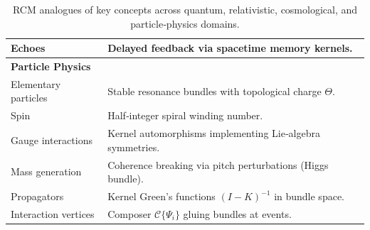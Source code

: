 \begin{table}[H]
\begin{tabular}{p{} p{}}
    Echoes 
      & Delayed feedback via spacetime memory kernels. \\[4pt]
    \midrule
    \multicolumn{2}{l}{\textbf{Particle Physics}} \\[-3pt]
    \midrule
    Elementary particles 
      & Stable resonance bundles with topological charge $\Theta$. \\
    Spin 
      & Half‐integer spiral winding number. \\
    Gauge interactions 
      & Kernel automorphisms implementing Lie‐algebra symmetries. \\
    Mass generation 
      & Coherence breaking via pitch perturbations (Higgs bundle). \\
    Propagators 
      & Kernel Green’s functions $(I - K)^{-1}$ in bundle space. \\
    Interaction vertices 
      & Composer $\mathcal{C}\{\Psi_i\}$ gluing bundles at events. \\
    \bottomrule
  \end{tabular}
  \caption{RCM analogues of key concepts across quantum, relativistic, cosmological, and particle‐physics domains.}
\end{table}


